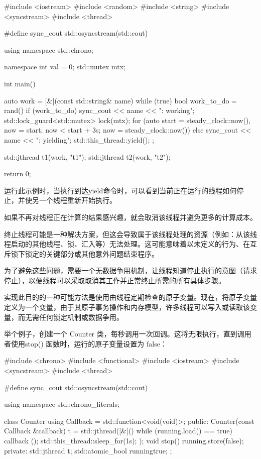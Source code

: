 \begin{cpp}
#include <iostream>
#include <random>
#include <string>
#include <syncstream>
#include <thread>

#define sync_cout std::osyncstream(std::cout)

using namespace std::chrono;

namespace {
    int val = 0;
    std::mutex mtx;
}

int main() {
    auto work = [&](const std::string& name) {
        while (true) {
            bool work_to_do = rand() %
            if (work_to_do) {
                sync_cout << name << ": working\n";
                std::lock_guard<std::mutex> lock(mtx);
                for (auto start = steady_clock::now(),
                          now = start;
                          now < start + 3s;
                          now = steady_clock::now()) {
                }
            } else {
                sync_cout << name << ": yielding\n";
                std::this_thread::yield();
            }
        }
    };

    std::jthread t1(work, "t1");
    std::jthread t2(work, "t2");

    return 0;
}
\end{cpp}

运行此示例时，当执行到达yield命令时，可以看到当前正在运行的线程如何停止，并使另一个线程重新开始执行。


如果不再对线程正在计算的结果感兴趣，就会取消该线程并避免更多的计算成本。

终止线程可能是一种解决方案，但这会导致属于该线程处理的资源（例如：从该线程启动的其他线程、锁、汇入等）无法处理。这可能意味着以未定义的行为、在互斥锁下锁定的关键部分或其他意外问题结束程序。

为了避免这些问题，需要一个无数据争用机制，让线程知道停止执行的意图（请求停止），以便线程可以采取取消其工作并正常终止所需的所有具体步骤。

实现此目的的一种可能方法是使用由线程定期检查的原子变量。现在，将原子变量定义为一个变量，由于其原子事务操作和内存模型，许多线程可以写入或读取该变量，而无需任何锁定机制或数据争用。

举个例子，创建一个 Counter 类，每秒调用一次回调。这将无限执行，直到调用者使用stop() 函数时，运行的原子变量设置为 false：

\begin{cpp}
#include <chrono>
#include <functional>
#include <iostream>
#include <syncstream>
#include <thread>

#define sync_cout std::osyncstream(std::cout)

using namespace std::chrono_literals;

class Counter {
    using Callback = std::function<void(void)>;
public:
    Counter(const Callback &callback) {
        t = std::jthread([&]() {
            while (running.load() == true) {
                callback ();
                std::this_thread::sleep_for(1s);
            }
        });
    }
    void stop() { running.store(false); }
private:
    std::jthread t;
    std::atomic_bool running{true};
};
\end{cpp}


